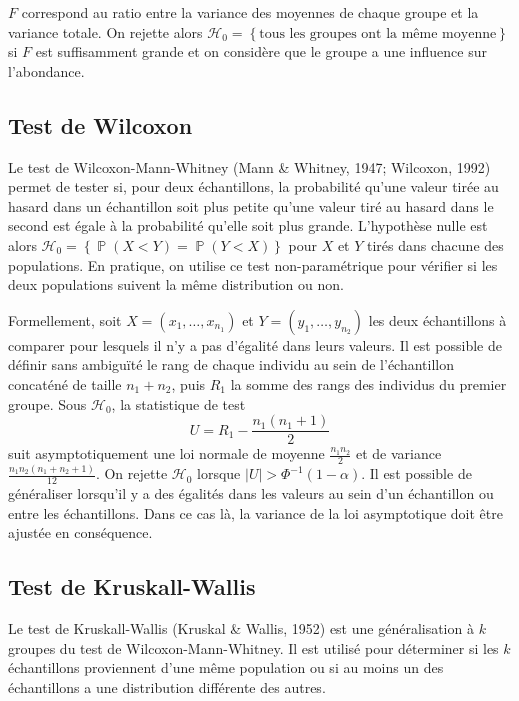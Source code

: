 \documentclass[12pt,a4paper]{reedthesis}
\DeclareMathOperator*{\prob}{\mathbb{P}}
\newcommand \PP [1]{\prob\left({#1}\right)}
\theoremstyle{definition}
\theoremstyle{definition}
\theoremstyle{definition}
\theoremstyle{remark}
\begin{document}
\(F\) correspond au ratio entre la variance des moyennes de chaque groupe et la variance totale. On rejette alors \(\mathcal{H}_0 = \left\{\text{tous les groupes ont la même moyenne}\right\}\) si \(F\) est suffisamment grande et on considère que le groupe a une influence sur l'abondance.

\hypertarget{test-de-wilcoxon}{%
\subsection{Test de Wilcoxon}\label{test-de-wilcoxon}}

Le test de Wilcoxon-Mann-Whitney (Mann \& Whitney, 1947; Wilcoxon, 1992) permet de tester si, pour deux échantillons, la probabilité qu'une valeur tirée au hasard dans un échantillon soit plus petite qu'une valeur tiré au hasard dans le second est égale à la probabilité qu'elle soit plus grande.
L'hypothèse nulle est alors \(\mathcal{H}_0 = \left\{\PP{X < Y} = \PP {Y < X} \right\}\) pour \(X\) et \(Y\) tirés dans chacune des populations.
En pratique, on utilise ce test non-paramétrique pour vérifier si les deux populations suivent la même distribution ou non.

Formellement, soit \(X = (x_1, \ldots, x_{n_1})\) et \(Y = (y_1, \ldots, y_{n_2})\) les deux échantillons à comparer pour lesquels il n'y a pas d'égalité dans leurs valeurs. Il est possible de définir sans ambiguïté le rang de chaque individu au sein de l'échantillon concaténé de taille \(n_1 + n_2\), puis \(R_1\) la somme des rangs des individus du premier groupe. Sous \(\mathcal{H}_0\), la statistique de test
\begin{equation*}
U = R_1 - \frac{n_1(n_1 + 1)}{2}
\end{equation*}
suit asymptotiquement une loi normale de moyenne \(\frac{n_1n_2}{2}\) et de variance \(\frac{n_1 n_2(n_1 + n_2 + 1)}{12}\). On rejette \(\mathcal{H}_0\) lorsque \(\left|U\right| > \Phi^{-1}(1-\alpha)\).
Il est possible de généraliser lorsqu'il y a des égalités dans les valeurs au sein d'un échantillon ou entre les échantillons. Dans ce cas là, la variance de la loi asymptotique doit être ajustée en conséquence.

\hypertarget{test-de-kruskall-wallis}{%
\subsection{Test de Kruskall-Wallis}\label{test-de-kruskall-wallis}}

Le test de Kruskall-Wallis (Kruskal \& Wallis, 1952) est une généralisation à \(k\) groupes du test de Wilcoxon-Mann-Whitney. Il est utilisé pour déterminer si les \(k\) échantillons proviennent d'une même population ou si au moins un des échantillons a une distribution différente des autres.
\end{document}
